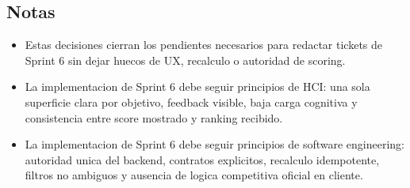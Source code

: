 \subsection{Notas}

\begin{itemize}
  \item Estas decisiones cierran los pendientes necesarios para redactar tickets de Sprint 6 sin dejar huecos de UX, recalculo o autoridad de scoring.
  \item La implementacion de Sprint 6 debe seguir principios de HCI: una sola superficie clara por objetivo, feedback visible, baja carga cognitiva y consistencia entre score mostrado y ranking recibido.
  \item La implementacion de Sprint 6 debe seguir principios de software engineering: autoridad unica del backend, contratos explicitos, recalculo idempotente, filtros no ambiguos y ausencia de logica competitiva oficial en cliente.
\end{itemize}
